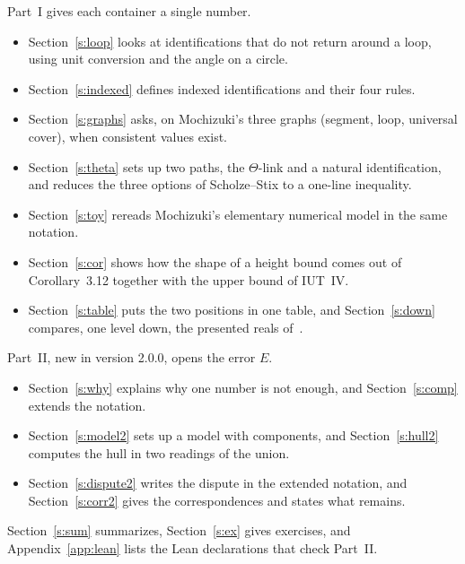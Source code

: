 \documentclass[11pt,a4paper]{article}
\theoremstyle{plain}
\theoremstyle{definition}
\theoremstyle{remark}
\begin{document}
Part~I gives each container a single number.
\begin{itemize}
\item Section~\ref{s:loop} looks at identifications that do not return around a loop, using unit conversion and the
angle on a circle.
\item Section~\ref{s:indexed} defines indexed identifications and their four rules.
\item Section~\ref{s:graphs} asks, on Mochizuki's three graphs (segment, loop, universal cover), when consistent values
exist.
\item Section~\ref{s:theta} sets up two paths, the $\Theta$-link and a natural identification, and reduces the three
options of Scholze--Stix to a one-line inequality.
\item Section~\ref{s:toy} rereads Mochizuki's elementary numerical model in the same notation.
\item Section~\ref{s:cor} shows how the shape of a height bound comes out of Corollary~3.12 together with the upper bound
of IUT~IV.
\item Section~\ref{s:table} puts the two positions in one table, and Section~\ref{s:down} compares, one level down,
the presented reals of~\cite{U}.
\end{itemize}
Part~II, new in version 2.0.0, opens the error $E$.
\begin{itemize}
\item Section~\ref{s:why} explains why one number is not enough, and Section~\ref{s:comp} extends the notation.
\item Section~\ref{s:model2} sets up a model with components, and Section~\ref{s:hull2} computes the hull in two
readings of the union.
\item Section~\ref{s:dispute2} writes the dispute in the extended notation, and Section~\ref{s:corr2} gives the
correspondences and states what remains.
\end{itemize}
Section~\ref{s:sum} summarizes, Section~\ref{s:ex} gives exercises, and Appendix~\ref{app:lean} lists the Lean
declarations that check Part~II.
\end{document}
